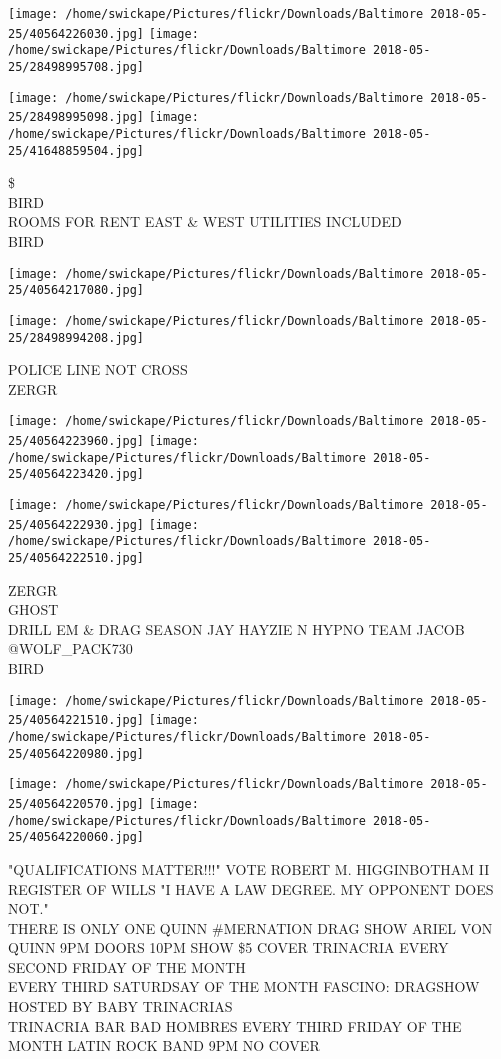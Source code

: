 \documentclass[10pt,letterpaper]{article}
\begin{document}
\texttt{[image: /home/swickape/Pictures/flickr/Downloads/Baltimore 2018-05-25/40564226030.jpg]}
\texttt{[image: /home/swickape/Pictures/flickr/Downloads/Baltimore 2018-05-25/28498995708.jpg]}

\texttt{[image: /home/swickape/Pictures/flickr/Downloads/Baltimore 2018-05-25/28498995098.jpg]}
\texttt{[image: /home/swickape/Pictures/flickr/Downloads/Baltimore 2018-05-25/41648859504.jpg]}

\$\\
BIRD\\
ROOMS FOR RENT EAST \& WEST UTILITIES INCLUDED\\
BIRD
\pagebreak

\texttt{[image: /home/swickape/Pictures/flickr/Downloads/Baltimore 2018-05-25/40564217080.jpg]}

\vspace{0.25in}
\texttt{[image: /home/swickape/Pictures/flickr/Downloads/Baltimore 2018-05-25/28498994208.jpg]}

POLICE LINE NOT CROSS\\
ZERGR
\pagebreak

\texttt{[image: /home/swickape/Pictures/flickr/Downloads/Baltimore 2018-05-25/40564223960.jpg]}
\texttt{[image: /home/swickape/Pictures/flickr/Downloads/Baltimore 2018-05-25/40564223420.jpg]}

\texttt{[image: /home/swickape/Pictures/flickr/Downloads/Baltimore 2018-05-25/40564222930.jpg]}
\texttt{[image: /home/swickape/Pictures/flickr/Downloads/Baltimore 2018-05-25/40564222510.jpg]}

ZERGR\\
GHOST\\
DRILL EM \& DRAG SEASON JAY HAYZIE N HYPNO TEAM JACOB @WOLF\_PACK730\\
BIRD
\pagebreak

\texttt{[image: /home/swickape/Pictures/flickr/Downloads/Baltimore 2018-05-25/40564221510.jpg]}
\texttt{[image: /home/swickape/Pictures/flickr/Downloads/Baltimore 2018-05-25/40564220980.jpg]}

\texttt{[image: /home/swickape/Pictures/flickr/Downloads/Baltimore 2018-05-25/40564220570.jpg]}
\texttt{[image: /home/swickape/Pictures/flickr/Downloads/Baltimore 2018-05-25/40564220060.jpg]}

"QUALIFICATIONS MATTER!!!" VOTE ROBERT M. HIGGINBOTHAM II REGISTER OF WILLS "I HAVE A LAW DEGREE.  MY OPPONENT DOES NOT."\\
THERE IS ONLY ONE QUINN \#MERNATION DRAG SHOW ARIEL VON QUINN 9PM DOORS 10PM SHOW \$5 COVER TRINACRIA EVERY SECOND FRIDAY OF THE MONTH\\
EVERY THIRD SATURDSAY OF THE MONTH FASCINO: DRAGSHOW HOSTED BY BABY TRINACRIAS\\
TRINACRIA BAR BAD HOMBRES EVERY THIRD FRIDAY OF THE MONTH LATIN ROCK BAND 9PM NO COVER
\pagebreak
\end{document}

